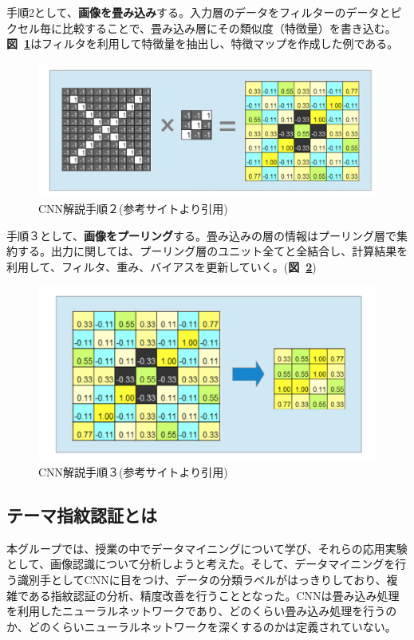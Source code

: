 \documentclass[a4paper, 11pt, titlepage]{jsarticle}
\begin{document}
手順2として、\textbf{画像を畳み込み}する。入力層のデータをフィルターのデータとピクセル毎に比較することで、畳み込み層にその類似度（特徴量）を書き込む。\textbf{図~\ref{cnn2}}はフィルタを利用して特徴量を抽出し、特徴マップを作成した例である。

\begin{figure}[h]
  \centering
  \includegraphics[scale=0.3]{cnn2.png}
  \caption{CNN解説手順２(参考サイト\cite{cnn}より引用)}
  \label{cnn2}
\end{figure}

手順３として、\textbf{画像をプーリング}する。畳み込みの層の情報はプーリング層で集約する。出力に関しては、プーリング層のユニット全てと全結合し、計算結果を利用して、フィルタ、重み、バイアスを更新していく。(\textbf{図~\ref{cnn3}})

\begin{figure}[h]
  \centering
  \includegraphics[scale=0.3]{cnn3.png}
  \caption{CNN解説手順３(参考サイト\cite{cnn}より引用)}
  \label{cnn3}
\end{figure}


\subsection{テーマ指紋認証とは}
本グループでは、授業の中でデータマイニングについて学び、それらの応用実験として、画像認識について分析しようと考えた。そして、データマイニングを行う識別手としてCNNに目をつけ、データの分類ラベルがはっきりしており、複雑である指紋認証の分析、精度改善を行うこととなった。CNNは畳み込み処理を利用したニューラルネットワークであり、どのくらい畳み込み処理を行うのか、どのくらいニューラルネットワークを深くするのかは定義されていない。
\end{document}
